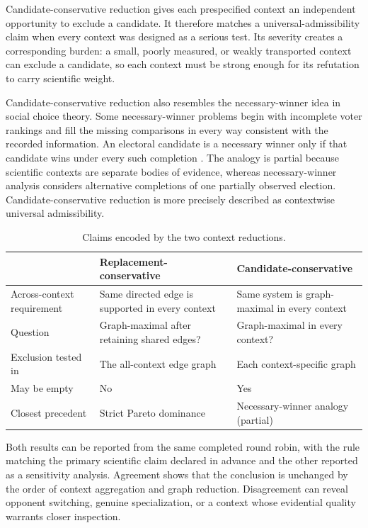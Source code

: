 \documentclass[11pt]{article}
\theoremstyle{remark}
\begin{document}
Candidate-conservative reduction gives each prespecified context an
independent opportunity to exclude a candidate. It therefore matches a
universal-admissibility claim when every context was designed as a serious
test. Its severity creates a corresponding burden: a small, poorly measured,
or weakly transported context can exclude a candidate, so each context must
be strong enough for its refutation to carry scientific weight.

Candidate-conservative reduction also resembles the necessary-winner idea in
social choice theory. Some necessary-winner problems begin with incomplete
voter rankings and fill the missing comparisons in every way consistent with
the recorded information. An electoral candidate is a necessary winner only
if that candidate wins under every such completion \cite{xia2011possible}.
The analogy is partial because scientific contexts are separate bodies of
evidence, whereas necessary-winner analysis considers alternative completions
of one partially observed election. Candidate-conservative reduction is more
precisely described as contextwise universal admissibility.

\begin{table}[H]
\centering
\caption{Claims encoded by the two context reductions.}
\label{tab:round-robin-rules}
\small
\begin{tabularx}{\textwidth}{@{}>{\raggedright\arraybackslash}p{}>{\raggedright\arraybackslash}X>{\raggedright\arraybackslash}X@{}}
\toprule
 & Replacement-conservative & Candidate-conservative \\
\midrule
Across-context requirement & Same directed edge is supported in every context & Same system is graph-maximal in every context \\
Question & Graph-maximal after retaining shared edges? & Graph-maximal in every context? \\
Exclusion tested in & The all-context edge graph & Each context-specific graph \\
May be empty & No & Yes \\
Closest precedent & Strict Pareto dominance & Necessary-winner analogy (partial) \\
\bottomrule
\end{tabularx}
\end{table}

Both results can be reported from the same completed round robin, with the
rule matching the primary scientific claim declared in advance and the other
reported as a sensitivity analysis. Agreement shows that the conclusion is
unchanged by the order of context aggregation and graph reduction.
Disagreement can reveal opponent switching, genuine specialization, or a
context whose evidential quality warrants closer inspection.
\end{document}
